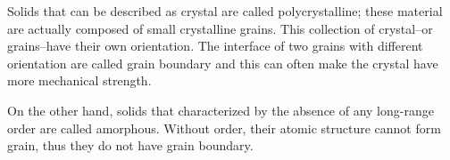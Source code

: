 \documentclass[../../../main.tex]{subfiles}
\begin{document}
Solids that can be described as crystal are called polycrystalline; these material are actually composed of small crystalline grains.
This collection of crystal--or grains--have their own orientation.
The interface of two grains with different orientation are called grain boundary and this can often make the crystal have more mechanical strength.

On the other hand, solids that  characterized by the absence of any long-range order are called amorphous. 
Without order, their atomic structure cannot form grain, thus they do not have grain boundary.
\end{document}
